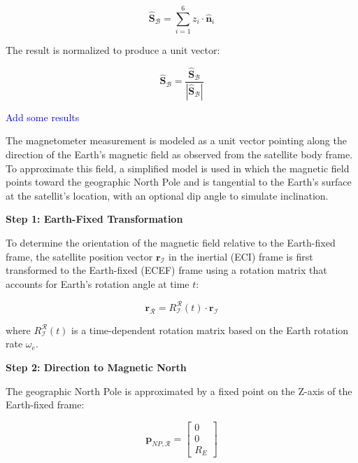 \begin{equation}
    \hat{\mathbf{S}}_\mathcal{B} = \sum_{i=1}^{6} z_i \cdot \hat{\mathbf{n}}_i
\end{equation}

The result is normalized to produce a unit vector:

\begin{equation}
    \hat{\mathbf{S}}_\mathcal{B} = \frac{\hat{\mathbf{S}}_\mathcal{B}}{|\hat{\mathbf{S}}_\mathcal{B}|}
\end{equation}


\textcolor{blue}{Add some results}


The magnetometer measurement is modeled as a unit vector pointing along the direction of the Earth's magnetic field as observed from the satellite body frame. To approximate this field, a simplified model is used in which the magnetic field points toward the geographic North Pole and is tangential to the Earth's surface at the satellit's location, with an optional dip angle to simulate inclination.

\textbf{Step 1: Earth-Fixed Transformation}

To determine the orientation of the magnetic field relative to the Earth-fixed frame, the satellite position vector $\mathbf{r}_{\mathcal{I}}$ in the inertial (ECI) frame is first transformed to the Earth-fixed (ECEF) frame using a rotation matrix that accounts for Earth's rotation angle at time $t$:

\begin{equation}
    \mathbf{r}_{\mathcal{R}} = R_{\mathcal{I}}^{\mathcal{R}}(t) \cdot \mathbf{r}_{\mathcal{I}}
\end{equation}

where $R_{\mathcal{I}}^{\mathcal{R}}(t)$ is a time-dependent rotation matrix based on the Earth rotation rate $\omega_e$.

\textbf{Step 2: Direction to Magnetic North}

The geographic North Pole is approximated by a fixed point on the Z-axis of the Earth-fixed frame:

\begin{equation}
    \mathbf{p}_{NP,\mathcal{R}} = \begin{bmatrix} 0 \\ 0 \\ R_E \end{bmatrix}
\end{equation}


